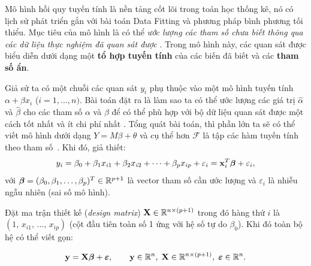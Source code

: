 Mô hình hồi quy tuyến tính là nền tảng cốt lõi trong toán học thống kê, nó có lịch sử phát triển gắn với bài toán Data Fitting và phương pháp bình phương tối thiểu. Mục tiêu của mô hình là có thể \textit{ước lượng các tham số chưa biết thông qua các dữ liệu thực nghiệm đã quan sát được} \cite{plackett1972}. Trong mô hình này, các quan sát được biểu diễn dưới dạng một \textbf{tổ hợp tuyến tính} của các biến đã biết và các \textbf{tham số ẩn}.  

Giả sử ta có một chuỗi các quan sát $y_i$ phụ thuộc vào một mô hình tuyến tính $\alpha + \beta x_i$ ($i = 1, ...,n)$. Bài toán đặt ra là làm sao ta có thể ước lượng các giá trị $\hat{\alpha}$ và $\hat{\beta}$ cho các tham số $\alpha$ và $\beta$ để có thể phù hợp với bộ dữ liệu quan sát được một cách tốt nhất và ít chi phí nhất \cite{plackett1972}. Tổng quát bài toán, thì phần lớn ta sẽ có thể viết mô hình dưới dạng $Y = M\beta + \theta$ và cụ thể hơn $\mathcal{F}$ là tập
các hàm tuyến tính theo tham số~\cite{strang2023}. Khi đó, giả thiết:
\[
    y_i = \beta_0 + \beta_1 x_{i1} + \beta_2 x_{i2} + \cdots + \beta_p x_{ip}
        + \varepsilon_i
        = \mathbf{x}_i^T \boldsymbol{\beta} + \varepsilon_i,
\]
với $\boldsymbol{\beta} = (\beta_0, \beta_1, \ldots, \beta_p)^T \in \mathbb{R}^{p+1}$
là vector tham số cần ước lượng và $\varepsilon_i$ là nhiễu ngẫu nhiên (sai số
mô hình).

Đặt ma trận thiết kế (\textit{design matrix})
$\mathbf{X} \in \mathbb{R}^{n \times (p+1)}$ trong đó hàng thứ $i$ là
$(1,\, x_{i1},\, \ldots,\, x_{ip})$ (cột đầu tiên toàn số 1 ứng với hệ số tự
do $\beta_0$). Khi đó toàn bộ hệ có thể viết gọn:

\begin{equation}
    \mathbf{y} = \mathbf{X}\boldsymbol{\beta} + \boldsymbol{\varepsilon},
    \qquad \mathbf{y} \in \mathbb{R}^n,\;
           \mathbf{X} \in \mathbb{R}^{n \times (p+1)},\;
           \boldsymbol{\varepsilon} \in \mathbb{R}^n.
    \label{eq:linear_model}
\end{equation}


